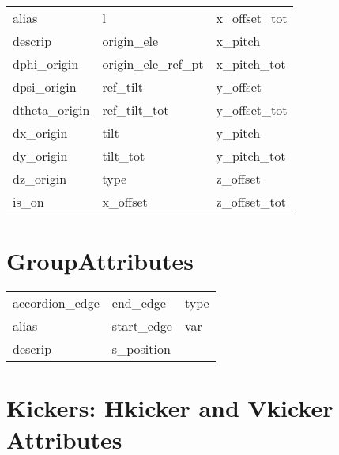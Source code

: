  \begin{tabular}{lll} \toprule
alias                       & l                           & x_offset_tot                \\
descrip                     & origin_ele                  & x_pitch                     \\
dphi_origin                 & origin_ele_ref_pt           & x_pitch_tot                 \\
dpsi_origin                 & ref_tilt                    & y_offset                    \\
dtheta_origin               & ref_tilt_tot                & y_offset_tot                \\
dx_origin                   & tilt                        & y_pitch                     \\
dy_origin                   & tilt_tot                    & y_pitch_tot                 \\
dz_origin                   & type                        & z_offset                    \\
is_on                       & x_offset                    & z_offset_tot                \\
 \bottomrule
 \end{tabular}
 \vfill
 
 \section{GroupAttributes}
 \label{s:list.group}
 
 \begin{tabular}{lll} \toprule
accordion_edge              & end_edge                    & type                        \\
alias                       & start_edge                  & var                         \\
descrip                     & s_position                  &                             \\
 \bottomrule
 \end{tabular}
 \vfill
 
 \section{Kickers: Hkicker and Vkicker Attributes}
 \label{s:list.hvkicker}
 
